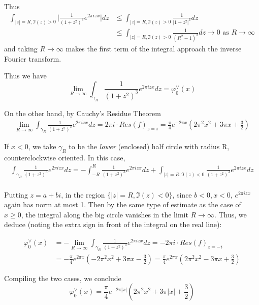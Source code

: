 \documentclass[11pt,a4paper]{article}
\begin{document}
Thus
\begin{align*}
    \int_{|z|=R, \Im(z)>0} \lvert \frac{1}{(1+z^2)^3}e^{2\pi i zx}\rvert dz &\le \int_{|z|=R, \Im(z)>0}  \frac{1}{\lvert 1+z^2 \rvert^3} dz \\
    &\le \int_{|z|=R, \Im(z)>0}  \frac{1}{(R^2-1)^3} dz \to 0 \text{ as } R\to\infty
\end{align*}
and taking $R\to \infty$ makes the first term of the integral approach the inverse Fourier transform.

Thus we have 
\begin{equation*}
    \lim_{R\to\infty} \int_{\gamma_R} \frac{1}{(1+z^2)^3} e^{2\pi i z x} dz = \varphi_0^\vee (x)
\end{equation*}

On the other hand, by Cauchy's Residue Theorem
\begin{align*}
    \lim_{R\to\infty} \int_{\gamma_R} \frac{1}{(1+z^2)^3} e^{2\pi i z x} dz = 2\pi i \cdot Res(f)_{z=i} =  \frac{\pi}{4} e^{-2\pi x}(2\pi^2 x^2 + 3\pi x + \frac{3}{2})
\end{align*}

If $x<0$, we take $\gamma_R$ to be the \textit{lower} (enclosed) half circle with radius R, counterclockwise oriented. In this case,
\begin{align*}
    \int_{\gamma_R} \frac{1}{(1+z^2)^3} e^{2\pi i z x} dz = -\int_{-R}^R \frac{1}{(1+z^2)^3}e^{2\pi i zx} dz + \int_{|z|=R, \Im(z)<0} \frac{1}{(1+z^2)^3}e^{2\pi i zx} dz \\
\end{align*}

Putting $z = a+bi$, in the region $\{|z|=R, \Im(z)<0\}$, since $b<0, x<0$, $e^{2\pi i zx}$ again has norm at most 1. Then by the same type of estimate as the case of $x\ge 0$, the integral along the big circle vanishes in the limit $R\to\infty$. Thus, we deduce (noting the extra sign in front of the integral on the real line):

\begin{align*}
    \varphi_0^\vee(x) &= -\lim_{R\to\infty}\int_{\gamma_R} \frac{1}{(1+z^2)^3} e^{2\pi i z x} dz = -2\pi i\cdot Res(f)_{z=-i} \\
    &=-\frac{\pi}{4}e^{2\pi x}(-2\pi^2 x^2 + 3\pi x - \frac{3}{2}) = \frac{\pi}{4}e^{2\pi x}(2\pi^2 x^2 - 3\pi x + \frac{3}{2})
\end{align*}

Compiling the two cases, we conclude
\begin{equation*}
    \varphi_0^\vee (x) = \frac{\pi}{4}e^{-2\pi \lvert x\rvert}\left(2\pi^2x^2+3\pi \lvert x\rvert +\frac{3}{2}\right)
\end{equation*}
\end{document}
